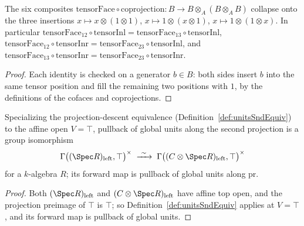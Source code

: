 \begin{lemma}
  \label{lem:tensorFace_comp}
  \leanok
  The six composites \(\mathrm{tensorFace} \circ \mathrm{coprojection} \colon B \to B \otimes_A
  (B \otimes_A B)\) collapse onto the three insertions \(x \mapsto x \otimes (1 \otimes 1)\),
  \(x \mapsto 1 \otimes (x \otimes 1)\), \(x \mapsto 1 \otimes (1 \otimes x)\).  In particular
  \(\mathrm{tensorFace}_{12} \circ \mathrm{tensorInl} = \mathrm{tensorFace}_{13} \circ
  \mathrm{tensorInl}\), \(\mathrm{tensorFace}_{12} \circ \mathrm{tensorInr} =
  \mathrm{tensorFace}_{23} \circ \mathrm{tensorInl}\), and \(\mathrm{tensorFace}_{13} \circ
  \mathrm{tensorInr} = \mathrm{tensorFace}_{23} \circ \mathrm{tensorInr}\).
\end{lemma}
\begin{proof}
  \leanok
  Each identity is checked on a generator \(b \in B\): both sides insert \(b\) into the same
  tensor position and fill the remaining two positions with \(1\), by the definitions of the
  cofaces and coprojections.
\end{proof}

\begin{definition}
  \label{def:unitsSndTopEquiv}
  \leanok
  Specializing the projection-descent equivalence (Definition~\ref{def:unitsSndEquiv}) to the
  affine open \(V = \top\), pullback of global units along the second projection is a group
  isomorphism
  \[
    \Gamma\bigl((\Spec R)_{\mathrm{left}}, \top\bigr)^{\times} \;\xrightarrow{\ \sim\ }\;
    \Gamma\bigl((C \otimes \Spec R)_{\mathrm{left}}, \top\bigr)^{\times}
  \]
  for a \(k\)-algebra \(R\); its forward map is pullback of global units along \(\mathrm{pr}\).
\end{definition}
\begin{proof}
  \leanok
  Both \((\Spec R)_{\mathrm{left}}\) and \((C \otimes \Spec R)_{\mathrm{left}}\) have affine top
  open, and the projection preimage of \(\top\) is \(\top\); so
  Definition~\ref{def:unitsSndEquiv} applies at \(V = \top\), and its forward map is pullback of
  global units.
\end{proof}

